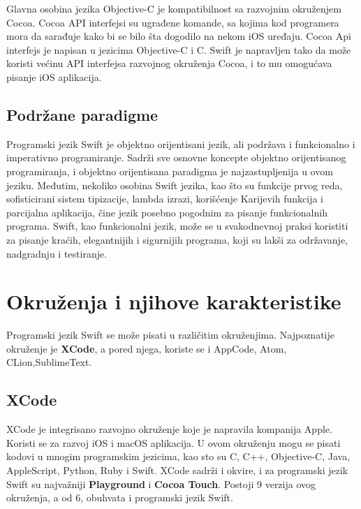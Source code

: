 \documentclass[a4paper]{article}
\begin{document}
Glavna osobina jezika Objective-C je kompatibilnost sa razvojnim okruženjem Cocoa.
Cocoa API interfejsi su ugrađene komande, sa kojima kod programera mora da sarađuje kako bi
se bilo šta dogodilo na nekom iOS uređaju. Cocoa Api interfejs je napisan u jezicima Objective-C i C. Swift je napravljen tako da može koristi većinu API interfejsa razvojnog okruženja Cocoa, i
to mu omogućava pisanje iOS aplikacija. 





\subsection{Podržane paradigme}
\label{subsec:podnaslovParadigma}

Programski jezik Swift je objektno orijentisani jezik, ali podržava i funkcionalno i imperativno
programiranje. Sadrži sve osnovne koncepte objektno orijentisanog programiranja, i objektno orijentisana paradigma je najzastupljenija u ovom jeziku. Međutim, nekoliko osobina Swift jezika, kao što su funkcije prvog reda, sofisticirani sistem tipizacije, lambda izrazi, korišćenje Karijevih funkcija i parcijalna aplikacija, čine jezik posebno pogodnim za pisanje funkcionalnih programa. Swift, kao funkcionalni jezik, može se u svakodnevnoj praksi koristiti za pisanje kraćih, elegantnijih i sigurnijih programa, koji su lakši za održavanje, nadgradnju i testiranje.




\section{Okruženja i njihove karakteristike}	
\label{sec:cetvrtiDeo}

Programski jezik Swift se može pisati u različitim okruženjima. Najpoznatije okruženje je \textbf{XCode}, a pored njega, koriste se i AppCode, Atom, CLion,SublimeText.

\subsection{XCode}
\label{subsec:podnaslovXCode}



XCode je integrisano razvojno okruženje koje je napravila kompanija Apple. Koristi se za razvoj iOS i macOS aplikacija. U ovom okruženju mogu se pisati kodovi u mnogim programskim jezicima, kao sto su C, C++, Objective-C, Java, AppleScript, Python, Ruby i Swift. XCode sadrži i okvire, i za programski jezik Swift su najvažniji \textbf{Playground} i \textbf{Cocoa Touch}. 
Postoji 9 verzija ovog okruženja, a od 6, obuhvata i programski jezik Swift.
\vspace{5mm}
\end{document}
